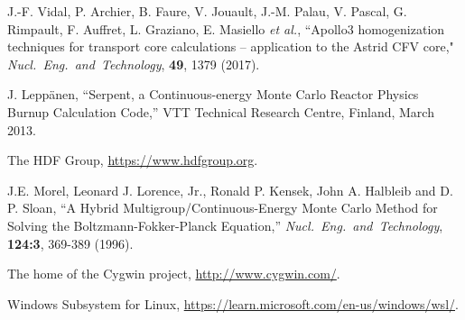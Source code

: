 \begin{thebibliography}{99}
J.-F. Vidal, P. Archier, B. Faure, V. Jouault, J.-M. Palau, V. Pascal, G. Rimpault, F. Auffret, L. Graziano, E. Masiello {\sl et al.}, ``Apollo3
homogenization techniques for transport core calculations -- application to the Astrid CFV core," {\sl Nucl.~Eng.~and~Technology}, {\bf 49}, 1379 (2017).

J. Lepp\"anen, ``Serpent, a Continuous-energy Monte Carlo Reactor Physics Burnup Calculation Code,'' VTT Technical Research Centre, Finland, March 2013.

The HDF Group, \url{https://www.hdfgroup.org}.

J.E. Morel, Leonard J. Lorence, Jr., Ronald P. Kensek, John A. Halbleib and D. P. Sloan, ``A Hybrid Multigroup/Continuous-Energy Monte Carlo Method for
Solving the Boltzmann-Fokker-Planck Equation,'' {\sl Nucl.~Eng.~and~Technology}, {\bf 124:3}, 369-389 (1996).

The home of the Cygwin project, \url{http://www.cygwin.com/}.

Windows Subsystem for Linux, \url{https://learn.microsoft.com/en-us/windows/wsl/}.

\end{thebibliography}
